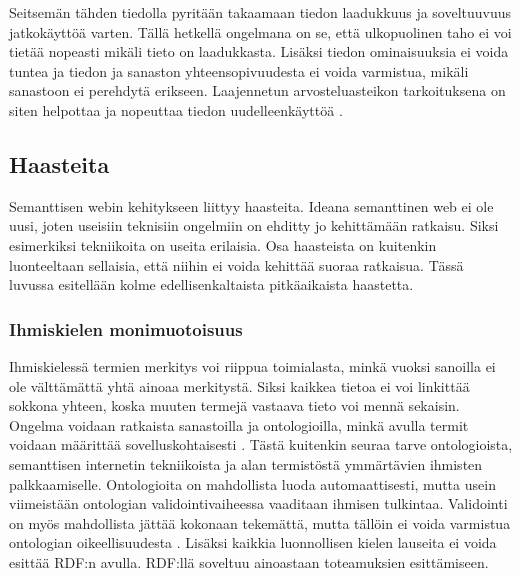 \documentclass[finnish, 12pt, a4paper, elec, utf8, pdfa, online]{aaltothesis}
\begin{document}
{Seitsemän tähden tiedolla pyritään takaamaan tiedon laadukkuus ja soveltuuvuus jatkokäyttöä varten. Tällä hetkellä ongelmana on se, että ulkopuolinen taho ei voi tietää nopeasti mikäli tieto on laadukkasta. Lisäksi tiedon ominaisuuksia ei voida tuntea ja tiedon ja sanaston yhteensopivuudesta ei voida varmistua, mikäli sanastoon ei perehdytä erikseen. Laajennetun arvosteluasteikon tarkoituksena on siten helpottaa ja nopeuttaa tiedon uudelleenkäyttöä \cite{SeCo_stars}.

\subsection{Haasteita}
Semanttisen webin kehitykseen liittyy haasteita. Ideana semanttinen web ei ole uusi, joten useisiin teknisiin ongelmiin on ehditty jo kehittämään ratkaisu. Siksi esimerkiksi tekniikoita on useita erilaisia. Osa haasteista on kuitenkin luonteeltaan sellaisia, että niihin ei voida kehittää suoraa ratkaisua. Tässä luvussa esitellään kolme edellisenkaltaista pitkäaikaista haastetta.


\subsubsection{Ihmiskielen monimuotoisuus}
Ihmiskielessä termien merkitys voi riippua toimialasta, minkä vuoksi sanoilla ei ole välttämättä yhtä ainoaa merkitystä. Siksi kaikkea tietoa ei voi linkittää sokkona yhteen, koska muuten termejä vastaava tieto voi mennä sekaisin. Ongelma voidaan ratkaista sanastoilla ja ontologioilla, minkä avulla termit voidaan määrittää sovelluskohtaisesti \cite{linked_data_finlad}. Tästä kuitenkin seuraa tarve ontologioista, semanttisen internetin tekniikoista ja alan termistöstä ymmärtävien ihmisten palkkaamiselle. Ontologioita on mahdollista luoda automaattisesti, mutta usein viimeistään ontologian validointivaiheessa vaaditaan ihmisen tulkintaa. Validointi on myös mahdollista jättää kokonaan tekemättä, mutta tällöin ei voida varmistua ontologian oikeellisuudesta \cite{automatic_ontology}. Lisäksi kaikkia luonnollisen kielen lauseita ei voida esittää RDF:n avulla. RDF:llä soveltuu ainoastaan toteamuksien esittämiseen.

}
\end{document}
